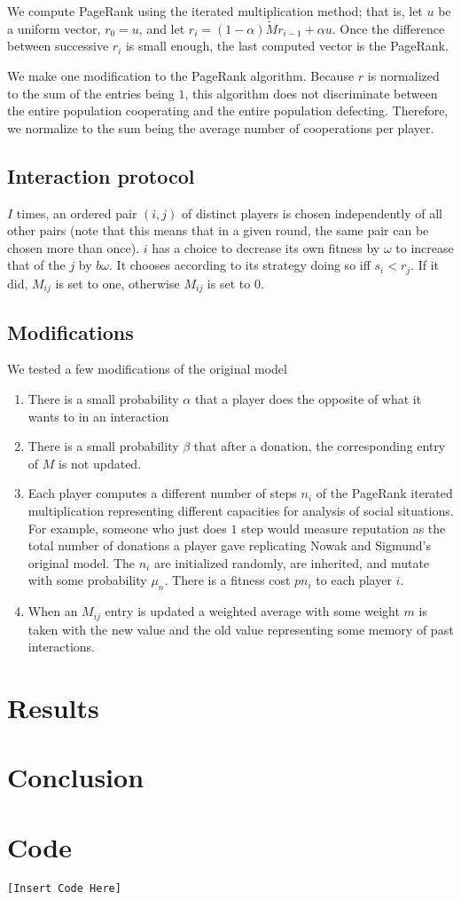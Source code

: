 \documentclass{amsart}
\begin{document}
We compute PageRank using the iterated multiplication method; that is, let $u$ be a uniform vector, $r_0 = u$, and let $r_i = (1-\alpha)\tilde M r_{i-1} + \alpha u$. Once the difference between successive $r_i$ is small enough, the last computed vector is the PageRank.

We make one modification to the PageRank algorithm. Because $r$ is normalized to the sum of the entries being $1$, this algorithm does not discriminate between the entire population cooperating and the entire population defecting. Therefore, we normalize to the sum being the average number of cooperations per player.

\subsection{Interaction protocol}
$I$ times, an ordered pair $(i,j)$ of distinct players is chosen independently of all other pairs (note that this means that in a given round, the same pair can be chosen more than once). $i$ has a choice to decrease its own fitness by $\omega$ to increase that of the $j$ by $b \omega$. It chooses according to its strategy doing so iff $s_i < r_j$. If it did, $M_{ij}$ is set to one, otherwise $M_{ij}$ is set to $0$. 

\subsection{Modifications}
We tested a few modifications of the original model
\begin{enumerate}
\item
There is a small probability $\alpha$ that a player does the opposite of what it wants to in an interaction
\item
There is a small probability $\beta$ that after a donation, the corresponding entry of $M$ is not updated.
\item
Each player computes a different number of steps $n_i$ of the PageRank iterated multiplication representing different capacities for analysis of social situations. For example, someone who just does $1$ step would measure reputation as the total number of donations a player gave replicating Nowak and Sigmund's original model. The $n_i$ are initialized randomly, are inherited, and mutate with some probability $\mu_n$. There is a fitness cost $p n_i$ to each player $i$.
\item
When an $M_{ij}$ entry is updated a weighted average with some weight $m$ is taken with the new value and the old value representing some memory of past interactions.
\end{enumerate}

\section{Results}

\section{Conclusion}

\section{Code}
\begin{verbatim}
[Insert Code Here]
\end{verbatim}




\end{document}
